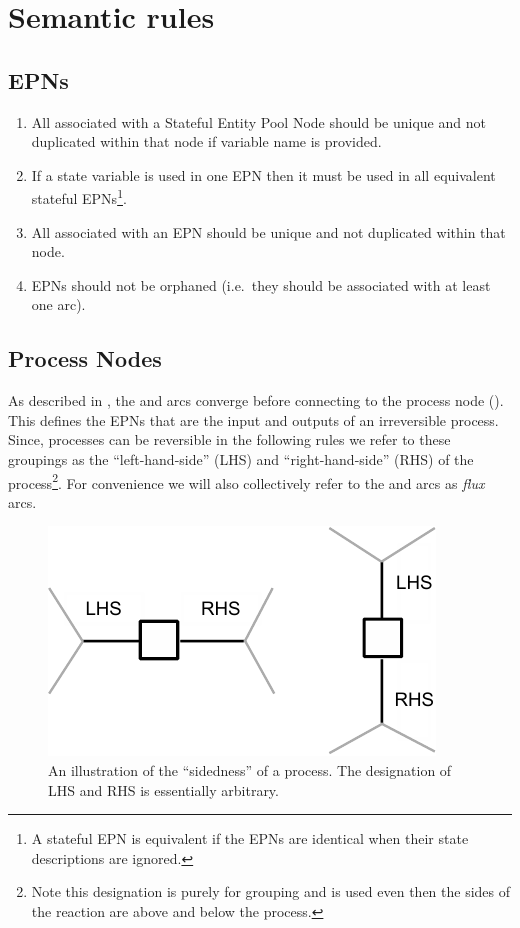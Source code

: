 \section{Semantic rules}

\subsection{EPNs}

 \begin{enumerate}
   \item All  associated with a Stateful Entity Pool Node should be unique and not duplicated within that node if variable name is provided.
   \item If a state variable is used in one EPN then it must be used in all equivalent stateful EPNs\footnote{A stateful EPN is equivalent if the EPNs are identical when their state descriptions are ignored.}.
   \item All  associated with an EPN should be unique and not duplicated within that node.
   \item EPNs should not be orphaned (i.e.\, they should be associated with at least one arc).
 \end{enumerate}

\subsection{Process Nodes}

As described in , the  and  arcs converge before connecting to the process node (). This defines the EPNs that are the input and outputs of an irreversible process. Since, processes can be reversible in the following rules we refer to these groupings as the ``left-hand-side'' (LHS) and ``right-hand-side'' (RHS) of the process\footnote{Note this designation is purely for grouping and is used even then the sides of the reaction are above and below the process.}. For convenience we will also collectively refer to the  and  arcs as \emph{flux} arcs.

\begin{figure}[H]
  \centering
  \includegraphics[scale = 0.8]{images/build/process_sidedness.pdf}
  \caption{An illustration of the ``sidedness'' of a process. The designation of LHS and RHS is essentially arbitrary.}
  \label{fig:process-sidedness}
\end{figure}

